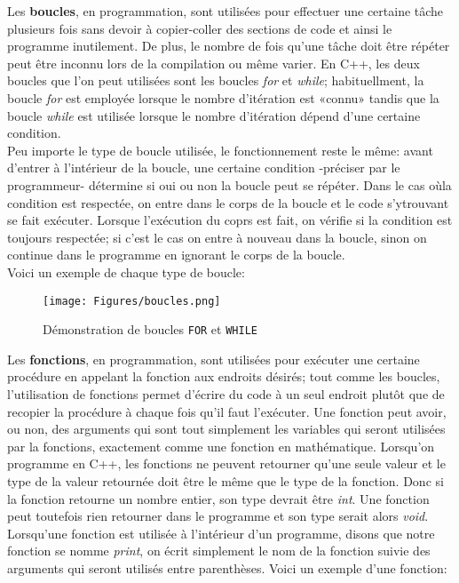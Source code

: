 \documentclass[]{report}
\begin{document}
\begin{adjustwidth}{1.5cm}{0cm}
Les \textbf{boucles}, en programmation, sont utilisées pour effectuer une certaine tâche plusieurs fois sans devoir à copier-coller des sections de code et ainsi le programme inutilement. De plus, le nombre de fois qu'une tâche doit être répéter peut être inconnu lors de la compilation ou même varier. En C++, les deux boucles que l'on peut utilisées sont les boucles \textit{for} et \textit{while}; habituellment, la boucle \textit{for} est employée lorsque le nombre d'itération est «connu» tandis que la boucle \textit{while} est utilisée lorsque le nombre d'itération dépend d'une certaine condition.\\ 

Peu importe le type de boucle utilisée, le fonctionnement reste le même: avant d'entrer à l'intérieur de la boucle, une certaine condition -préciser par le programmeur- détermine si oui ou non la boucle peut se répéter. Dans le cas oùla condition est respectée, on entre dans le corps de la boucle et le code s'ytrouvant se fait exécuter. Lorsque l'exécution du coprs est fait, on vérifie si la condition est toujours respectée; si c'est le cas on entre à nouveau dans la boucle, sinon on continue dans le programme en ignorant le corps de la boucle.\\

Voici un exemple de chaque type de boucle:
\begin{figure}[!h]
	\centering
	\texttt{[image: Figures/boucles.png]}
	\caption{Démonstration de boucles \texttt{FOR} et \texttt{WHILE}}
	\label{hw:fig:boucles}
\end{figure}

Les \textbf{fonctions}, en programmation, sont utilisées pour exécuter une certaine procédure en appelant la fonction aux endroits désirés; tout comme les boucles, l'utilisation de fonctions permet d'écrire du code à un seul endroit plutôt que de recopier la procédure à chaque fois qu'il faut l'exécuter. Une fonction peut avoir, ou non, des arguments qui sont tout simplement les variables qui seront utilisées par la fonctions, exactement comme une fonction en mathématique. Lorsqu'on programme en C++, les fonctions ne peuvent retourner qu'une seule valeur et le type de la valeur retournée doit être le même que le type de la fonction. Donc si la fonction retourne un nombre entier, son type devrait être \textit{int}. Une fonction peut toutefois rien retourner dans le programme et son type serait alors \textit{void}. Lorsqu'une fonction est utilisée à l'intérieur d'un programme, disons que notre fonction se nomme \textit{print}, on écrit simplement le nom de la fonction suivie des arguments qui seront utilisés entre parenthèses. Voici un exemple d'une fonction:


\end{adjustwidth}
\end{document}
